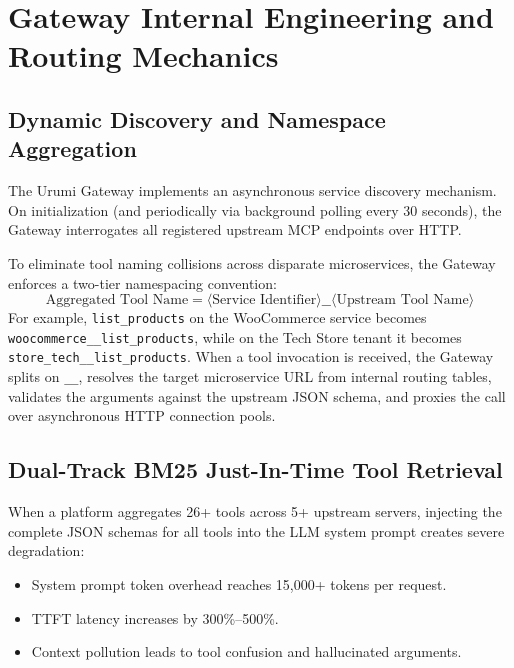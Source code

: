 \documentclass[11pt,a4paper]{article}
\begin{document}
\section{Gateway Internal Engineering and Routing Mechanics}

\subsection{Dynamic Discovery and Namespace Aggregation}
The Urumi Gateway implements an asynchronous service discovery mechanism. On initialization (and periodically via background polling every 30 seconds), the Gateway interrogates all registered upstream MCP endpoints over HTTP. 

To eliminate tool naming collisions across disparate microservices, the Gateway enforces a two-tier namespacing convention:
\begin{equation}
\text{Aggregated Tool Name} = \langle \text{Service Identifier} \rangle \_\_ \langle \text{Upstream Tool Name} \rangle
\end{equation}
For example, \texttt{list\_products} on the WooCommerce service becomes \texttt{woocommerce\_\_list\_products}, while on the Tech Store tenant it becomes \texttt{store\_tech\_\_list\_products}. When a tool invocation is received, the Gateway splits on \texttt{\_\_}, resolves the target microservice URL from internal routing tables, validates the arguments against the upstream JSON schema, and proxies the call over asynchronous HTTP connection pools.

\subsection{Dual-Track BM25 Just-In-Time Tool Retrieval}
When a platform aggregates 26+ tools across 5+ upstream servers, injecting the complete JSON schemas for all tools into the LLM system prompt creates severe degradation:
\begin{itemize}[leftmargin=*]
    \item System prompt token overhead reaches 15,000+ tokens per request.
    \item TTFT latency increases by 300\%--500\%.
    \item Context pollution leads to tool confusion and hallucinated arguments.
\end{itemize}
\end{document}
